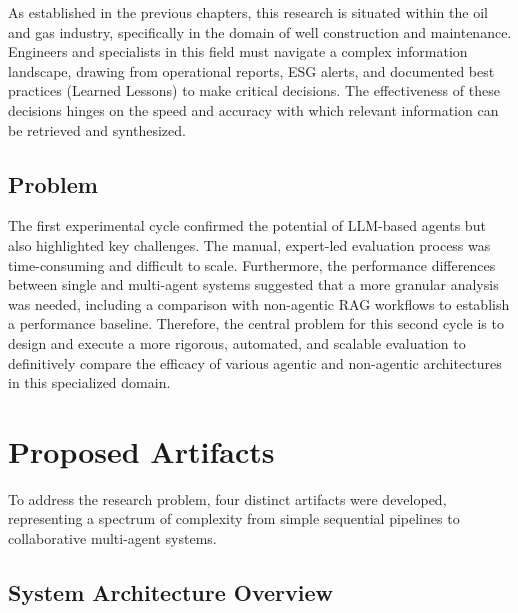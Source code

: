    As established in the previous chapters, this research is situated within the oil and gas industry, specifically in the domain of well construction and maintenance. Engineers and specialists in this field must navigate a complex information landscape, drawing from operational reports, ESG alerts, and documented best practices (Learned Lessons) to make critical decisions. The effectiveness of these decisions hinges on the speed and accuracy with which relevant information can be retrieved and synthesized.

    \subsection{Problem}

    The first experimental cycle confirmed the potential of LLM-based agents but also highlighted key challenges. The manual, expert-led evaluation process was time-consuming and difficult to scale. Furthermore, the performance differences between single and multi-agent systems suggested that a more granular analysis was needed, including a comparison with non-agentic RAG workflows to establish a performance baseline. Therefore, the central problem for this second cycle is to design and execute a more rigorous, automated, and scalable evaluation to definitively compare the efficacy of various agentic and non-agentic architectures in this specialized domain.



\section{Proposed Artifacts}

    To address the research problem, four distinct artifacts were developed, representing a spectrum of complexity from simple sequential pipelines to collaborative multi-agent systems. 
    
    \subsection{System Architecture Overview}

